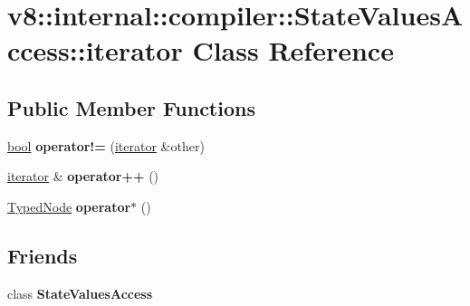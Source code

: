 \hypertarget{classv8_1_1internal_1_1compiler_1_1StateValuesAccess_1_1iterator}{}\section{v8\+:\+:internal\+:\+:compiler\+:\+:State\+Values\+Access\+:\+:iterator Class Reference}
\label{classv8_1_1internal_1_1compiler_1_1StateValuesAccess_1_1iterator}
\subsection*{Public Member Functions}
\begin{DoxyCompactItemize}
\item 
\mbox{\label{classv8_1_1internal_1_1compiler_1_1StateValuesAccess_1_1iterator_a12428ede806c832b11b3f578d5b66630}} 
\mbox{\hyperlink{classbool}{bool}} {\bfseries operator!=} (\mbox{\hyperlink{classv8_1_1internal_1_1compiler_1_1StateValuesAccess_1_1iterator}{iterator}} \&other)
\item 
\mbox{\label{classv8_1_1internal_1_1compiler_1_1StateValuesAccess_1_1iterator_a37af8d22f9f63807961d2a60b8337ea8}} 
\mbox{\hyperlink{classv8_1_1internal_1_1compiler_1_1StateValuesAccess_1_1iterator}{iterator}} \& {\bfseries operator++} ()
\item 
\mbox{\label{classv8_1_1internal_1_1compiler_1_1StateValuesAccess_1_1iterator_aeb599e9b153780dd735e91936764f434}} 
\mbox{\hyperlink{structv8_1_1internal_1_1compiler_1_1StateValuesAccess_1_1TypedNode}{Typed\+Node}} {\bfseries operator$\ast$} ()
\end{DoxyCompactItemize}
\subsection*{Friends}
\begin{DoxyCompactItemize}
\item 
\mbox{\label{classv8_1_1internal_1_1compiler_1_1StateValuesAccess_1_1iterator_a0cdd3c53962ccca30c4cc916410f12ef}} 
class {\bfseries State\+Values\+Access}
\end{DoxyCompactItemize}



